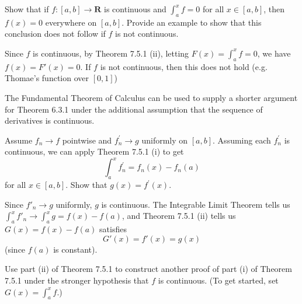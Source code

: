 \begin{exercise} Show that if $f:[a, b] \rightarrow \mathbf{R}$ is continuous and $\int_{a}^{x} f=0$ for all $x \in[a, b]$, then $f(x)=0$ everywhere on $[a, b]$. Provide an example to show that this conclusion does not follow if $f$ is not continuous.
\end{exercise}
\begin{solution}
Since \(f\) is continuous, by Theorem 7.5.1 (ii), letting \(F(x) = \int^x_a f = 0\), we have \(f(x) = F'(x) = 0\). If \(f\) is not continuous, then this does not hold (e.g. Thomae's function over \([0,1]\))
\end{solution}

\begin{exercise}
The Fundamental Theorem of Calculus can be used to supply a shorter argument for Theorem 6.3.1 under the additional assumption that the sequence of derivatives is continuous.

Assume $f_{n} \rightarrow f$ pointwise and $f_{n}^{\prime} \rightarrow g$ uniformly on $[a, b]$. Assuming each $f_{n}^{\prime}$ is continuous, we can apply Theorem 7.5.1 (i) to get
$$
\int_{a}^{x} f_{n}^{\prime}=f_{n}(x)-f_{n}(a)
$$
for all $x \in[a, b]$. Show that $g(x)=f^{\prime}(x)$.
\end{exercise}
\begin{solution}
Since \(f'_n \to g\) uniformly, \(g\) is continuous. The Integrable Limit Theorem tells us \(\int^x_a f'_n \to \int^x_a g = f(x) - f(a)\), and Theorem 7.5.1 (ii) tells us \(G(x) = f(x) - f(a)\) satisfies \[G'(x) = f'(x) = g(x)\]
(since \(f(a)\) is constant).
\end{solution}

\begin{exercise}
\end{exercise}
\begin{solution}
    \TODO
\end{solution}

\begin{exercise} Use part (ii) of Theorem 7.5.1 to construct another proof of part (i) of Theorem 7.5.1 under the stronger hypothesis that $f$ is continuous. (To get started, set \(G(x)=\int_{a}^{x} f\).)
\end{exercise}
\begin{solution}
    \TODO
\end{solution}

